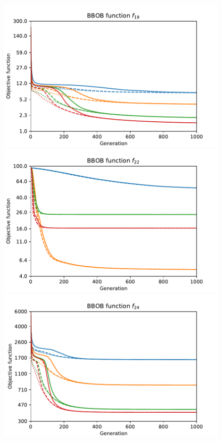\begin{figure}[ht!]
    \centering
    \begin{minipage}[t]{0.32\textwidth}
        \centering
        \includegraphics[width=\textwidth]{img/runs/fitness_pso2006_f19.pdf}
    \end{minipage}
    \hfill
    \begin{minipage}[t]{0.32\textwidth}
        \centering
        \includegraphics[width=\textwidth]{img/runs/fitness_pso2006_f22.pdf}
    \end{minipage}
    \hfill
    \begin{minipage}[t]{0.32\textwidth}
        \centering
        \includegraphics[width=\textwidth]{img/runs/fitness_pso2006_f24.pdf}
    \end{minipage}


\end{figure}
